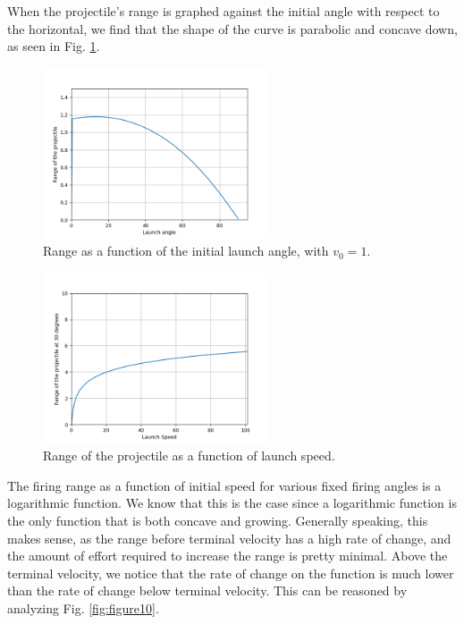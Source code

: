 \documentclass[12pt]{iopart} %
\begin{document}
When the projectile's range is graphed against the initial angle with respect to the horizontal, we find that the shape of the curve is parabolic and concave down, as seen in Fig. \ref{fig:figure7}.

\begin{figure}[h!tbp]
  \begin{center}
 \item[]\includegraphics[width=0.6\textwidth]{figure7.png}
  \caption{\label{fig:figure7}
  Range as a function of the initial launch angle, with $v_0 = 1$.
  }
  \end{center}
\end{figure}

\begin{figure}[h!tbp]
  \begin{center}
 \item[]\includegraphics[width=0.6\textwidth]{figure9.png}
  \caption{\label{fig:figure9}
  Range of the projectile as a function of launch speed.
  }
  \end{center}
\end{figure}

The firing range as a function of initial speed for various fixed firing angles is a logarithmic function. 
We know that this is the case since a logarithmic function is the only function that is both concave and growing. 
Generally speaking, this makes sense, as the range before terminal velocity has a high rate of change, and the amount of effort required to increase the range is pretty minimal. 
Above the terminal velocity, we notice that the rate of change on the function is much lower than the rate of change below terminal velocity. 
This can be reasoned by analyzing Fig. \ref{fig:figure10}.
\end{document}
